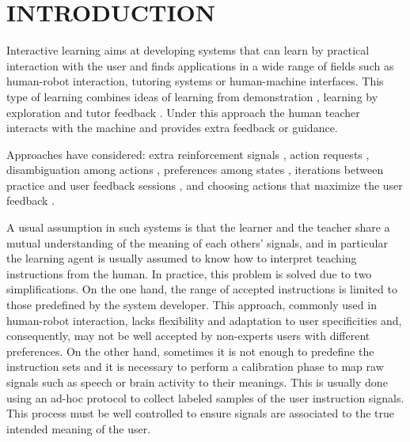 \section{INTRODUCTION}




Interactive learning \cite{nicolescu2003natural,breazeal2004tutelage} aims at developing systems that can learn by practical interaction with the user and finds applications in a wide range of fields such as human-robot interaction, tutoring systems or human-machine interfaces.
This type of learning combines ideas of learning from demonstration \cite{argall2009survey}, learning by exploration \cite{sutton1998reinforcement} and tutor feedback \cite{kaplan2002robotic}. Under this approach the human teacher interacts with the machine and provides extra feedback or guidance. 

Approaches have considered: extra reinforcement signals \cite{thomaz2008teachable}, action requests \cite{lopes2009active}, disambiguation among actions \cite{chernova2009interactive}, preferences among states \cite{mason2011robot}, iterations between practice and user feedback sessions \cite{judah2010reinforcement}, and choosing actions that maximize the user feedback \cite{knox2009interactively}. 

A usual assumption in such systems is that the learner and the teacher share a mutual understanding of the meaning of each others' signals, and in particular the learning agent is usually assumed to know how to interpret teaching instructions from the human. In practice, this problem is solved due to two simplifications. On the one hand, the range of accepted instructions is limited to those predefined by the system developer. This approach, commonly used in human-robot interaction, lacks flexibility and adaptation to user specificities and, consequently, may not be well accepted by non-experts users with different preferences. 
%
On the other hand, sometimes it is not enough to predefine the instruction sets and it is necessary to perform a calibration phase to map raw signals such as speech or brain activity to their meanings. This is usually done using an ad-hoc protocol to collect labeled samples of the user instruction signals. This process must be well controlled to ensure signals are associated to the true intended meaning of the user.

